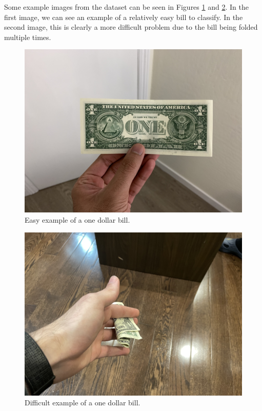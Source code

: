 \documentclass[a4paper,11pt]{article}
\begin{document}
Some example images from the dataset can be seen in Figures \ref{fig:one_dollar_nice} and \ref{fig:one_dollar_hard}. In the first image, we can see an example of a relatively easy bill to classify. In the second image, this is clearly a more difficult problem due to the bill being folded multiple times.

\begin{figure}[H]
\centering
\includegraphics[scale=0.09]{img/cv/money/one_dollar_bill_nice.jpeg}
\caption{Easy example of a one dollar bill.}
\label{fig:one_dollar_nice}
\end{figure}

\begin{figure}[H]
\centering
\includegraphics[scale=0.09]{img/cv/money/one_dollar_bill_hard.jpeg}
\caption{Difficult example of a one dollar bill.}
\label{fig:one_dollar_hard}
\end{figure}
\end{document}
